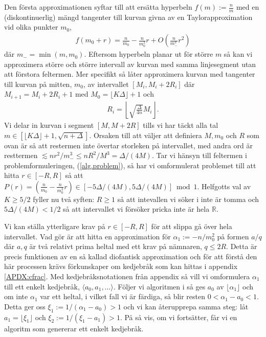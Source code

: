 Den första approximationen syftar till att ersätta hyperbeln \(f(m) := \frac{n}{m}\) med en (diskontinuerlig) mängd tangenter till kurvan givna av en Taylorapproximation vid olika punkter \(m_0\),
\begin{align*}
    f(m_0 + r) = \frac{n}{m_0} - \frac{n}{m_0^2} r + O\left(\frac{n}{m_-^3} r^2 \right)
\end{align*} %
där \(m_- = \min(m, m_0)\). Eftersom hyperbeln planar ut för större $m$ så kan vi approximera större och större intervall av kurvan med samma linjesegment utan att förstora feltermen. Mer specifikt så låter \cite{HaraldSieve} approximera kurvan med tangenter till kurvan på mitten, $m_0$, av intervallet \([M_i, M_i + 2R_i]\) där  $M_{i + 1} = M_i + 2R_i + 1$ med $M_0 = \lfloor K \Delta \rfloor + 1$ och
\begin{align*}
    R_i = \left\lfloor \sqrt{\frac{\Delta}{4n}} M_i \right\rfloor .
\end{align*}
Vi delar in kurvan i segment \([M, M + 2R]\) tills vi har täckt alla tal \(m \in [  \lfloor K \Delta \rfloor + 1, \sqrt{n + \Delta}]\). Orsaken till att \cite{HaraldSieve} väljer att definiera \(M, m_0\) och \(R\) som ovan är så att restermen inte övertar storleken på intervallet, med andra ord är resttermen \(\lesssim nr^2/m_-^3 \leq nR^2/M^3 = \Delta / (4M)\). Tar vi hänsyn till feltermen i problemformuleringen, (\ref{alg.problem}), så har vi omformulerat problemet till att hitta \(r \in [-R, R]\) så att \(P(r) = (\frac{n}{m_0} - \frac{n}{m_0^2} r) \in [-5\Delta/(4M), 5\Delta/(4M)] \bmod{1}\). Helfgotts val av \(K \geq 5/2\) fyller nu två syften: \(R \geq 1\) så att intevallen vi söker i inte är tomma och \(5\Delta/(4M) < 1/2\) så att intervallet vi försöker pricka inte är hela \(\mathbb{R}\).

Vi kan ställa ytterligare krav på \(r \in [-R, R]\) för att slippa gå över hela intervallet. Vad \cite{HaraldSieve} gör är att hitta en approximation för \(\alpha_1 := -n/m_0^2\) på formen \(a/q\) där $a,q$ är två relativt prima heltal med ett krav på nämnaren, $q \leq 2R$. Detta är precis funktionen av en så kallad diofantisk approximation och för att förstå den här processen krävs förkunskaper om kedjebråk som kan hittas i appendix \ref{APDX:cfrac}. Med kedjebråksnotationen från appendix så vill vi omformulera \(\alpha_1\) till ett enkelt kedjebråk, \(\langle a_0, a_1, \dots \rangle\). Följer vi algoritmen i \cite[Sats 21.5]{Lindahl} så ges \(a_0\) av \(\lfloor \alpha_1 \rfloor\) och om inte \(\alpha_1\) var ett heltal, i vilket fall vi är färdiga, så blir resten \(0 < \alpha_1 - a_0 < 1\). Detta ger oss \(\xi_1 := 1 / (\alpha_1 - a_0) > 1\) och vi kan återupprepa samma steg: låt \(a_1 = \lfloor \xi_1 \rfloor\) och \(\xi_2 := 1 / (\xi_1 - a_1) > 1\). På så vis, om vi fortsätter, får vi en algoritm som genererar ett enkelt kedjebråk. 


